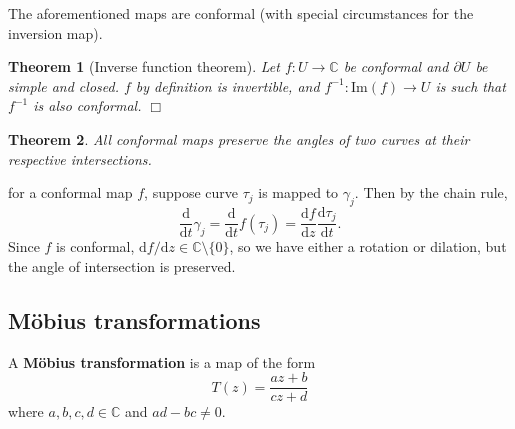 \documentclass[letter-paper]{tufte-book}
\newtheorem{theorem}{\color{pastel-blue}Theorem}[section]
\newenvironment{proof}[1][Proof]{\begin{trivlist}
\item[\hskip \labelsep {\bfseries #1}]}{\end{trivlist}}
\newcommand{\qedwhite}{\hfill \ensuremath{\Box}}
\begin{document}
The aforementioned maps are conformal (with special circumstances for the
inversion map).

\begin{theorem}[Inverse function theorem]
  Let $f: U \to \mathbb{C}$ be conformal and $\partial U$ be simple and closed.
  $f$ by definition is invertible, and $f^{-1} : \mathrm{Im}(f) \to U$ is such
  that $f^{-1}$ is also conformal. \qedwhite
\end{theorem}

\begin{theorem}
  All conformal maps preserve the angles of two curves at their respective
  intersections.
\end{theorem}

\begin{proof}
  for a conformal map $f$, suppose curve $\tau_j$ is mapped to $\gamma_j$. Then
  by the chain rule,
  \begin{equation*}
    \frac{\mathrm{d}}{\mathrm{d}t} \gamma_j = \frac{\mathrm{d}}{\mathrm{d}t} f(\tau_j) = \frac{\mathrm{d}f}{\mathrm{d}z} \frac{\mathrm{d}\tau_j}{\mathrm{d}t}.
  \end{equation*}
  Since $f$ is conformal, $\mathrm{d}f/\mathrm{d}z \in \mathbb{C} \setminus
  \{0\}$, so we have either a rotation or dilation, but the angle of
  intersection is preserved.
\end{proof}


\subsection{M\"obius transformations}

A \textbf{M\"obius transformation} is a map of the form
\begin{equation}
  T(z) = \frac{az + b}{cz + d}
\end{equation}
where $a,b,c,d \in \mathbb{C}$ and $ad - bc \neq 0$.
\end{document}
